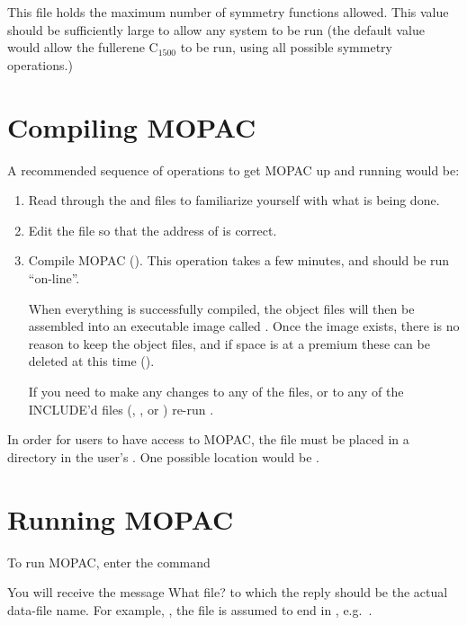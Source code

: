 \section{} \label{symtryh}
This file holds the maximum number of symmetry functions allowed. This value
should be sufficiently large to allow any system to be run (the default value
would allow the fullerene C$_{1500}$ to be run, using all possible symmetry
operations.)

\section{Compiling MOPAC}
A recommended sequence of operations to get MOPAC  up  and  running
would be:
\begin{enumerate}
\item Read through the  and  files to  familiarize 
yourself  with what is being done.
\item Edit the file  so that the address of  is
correct.
\item Compile MOPAC ().  This operation takes a few minutes, and 
should be run ``on-line''.

When everything is successfully compiled,  the  object  files  will then  be 
assembled into an executable image called .  Once the image
exists, there is no reason to keep the object files, and if  space is at a
premium these can be deleted at this time ().

If you need to make any  changes  to  any  of  the  files, or to any of the
INCLUDE'd files (, ,  or ) re-run
.
\end{enumerate}

In order for users to have access to  MOPAC, the file  must be
placed in a directory in the user's . One possible location would be
.


\section{Running MOPAC}
To run MOPAC, enter the command  
                  
You will receive the message {\sc  What file?} to which the reply should be the
actual data-file name. For example, , the file is assumed to end in
, e.g.\ .


